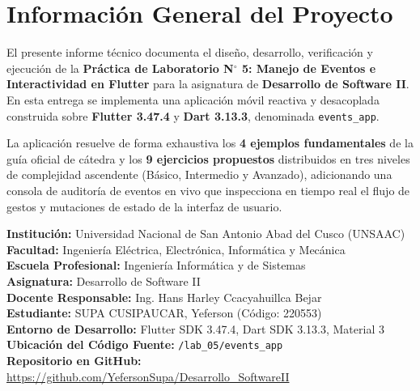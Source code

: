 \documentclass[12pt,a4paper]{article}
\begin{document}
  \tableofcontents
  \newpage

  \section{Información General del Proyecto}

  El presente informe técnico documenta el diseño, desarrollo, verificación y ejecución de la \textbf{Práctica de Laboratorio N$^\circ$ 5: Manejo de Eventos e Interactividad en Flutter} para la asignatura de \textbf{Desarrollo de Software II}. En esta entrega se implementa una aplicación móvil reactiva y desacoplada construida sobre \textbf{Flutter 3.47.4} y \textbf{Dart 3.13.3}, denominada \texttt{events\_app}.

  La aplicación resuelve de forma exhaustiva los \textbf{4 ejemplos fundamentales} de la guía oficial de cátedra y los \textbf{9 ejercicios propuestos} distribuidos en tres niveles de complejidad ascendente (Básico, Intermedio y Avanzado), adicionando una consola de auditoría de eventos en vivo que inspecciona en tiempo real el flujo de gestos y mutaciones de estado de la interfaz de usuario.

  \begin{tcolorbox}[colback=calloutbg,colframe=calloutborder,title=\textbf{Ficha Técnica de la Práctica 05}]
  \textbf{Institución:} Universidad Nacional de San Antonio Abad del Cusco (UNSAAC)\\
  \textbf{Facultad:} Ingeniería Eléctrica, Electrónica, Informática y Mecánica\\
  \textbf{Escuela Profesional:} Ingeniería Informática y de Sistemas\\
  \textbf{Asignatura:} Desarrollo de Software II\\
  \textbf{Docente Responsable:} Ing. Hans Harley Ccacyahuillca Bejar\\
  \textbf{Estudiante:} SUPA CUSIPAUCAR, Yeferson (Código: 220553)\\
  \textbf{Entorno de Desarrollo:} Flutter SDK 3.47.4, Dart SDK 3.13.3, Material 3\\
  \textbf{Ubicación del Código Fuente:} \texttt{/lab\_05/events\_app}\\
  \textbf{Repositorio en GitHub:} \url{https://github.com/YefersonSupa/Desarrollo_SoftwareII}
  \end{tcolorbox}
\end{document}
